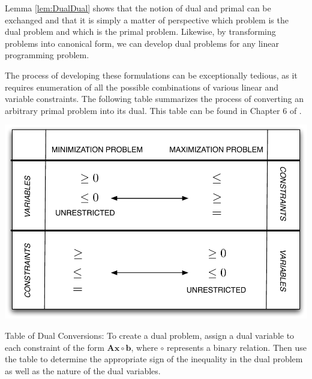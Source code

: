 Lemma \ref{lem:DualDual} shows that the notion of dual and primal can be exchanged and that it is simply a matter of perspective which problem is the dual problem and which is the primal problem. Likewise, by transforming problems into canonical form, we can develop dual problems for any linear programming problem. 

The process of developing these formulations can be exceptionally tedious, as it requires enumeration of all the possible combinations of various linear and variable constraints. The following table summarizes the process of converting an arbitrary primal problem into its dual. This table can be found in Chapter 6 of \cite{BJS04}.

\begin{table}[hbt]
\centering
\includegraphics[scale=0.5]{DualConversionTable.pdf}
\caption{Table of Dual Conversions: To create a dual problem, assign a dual variable to each constraint of the form $\mathbf{A}\mathbf{x} \circ \mathbf{b}$, where $\circ$ represents a binary relation. Then use the table to determine the appropriate sign of the inequality in the dual problem as well as the nature of the dual variables.}
\label{tab:Duality}
\end{table}

